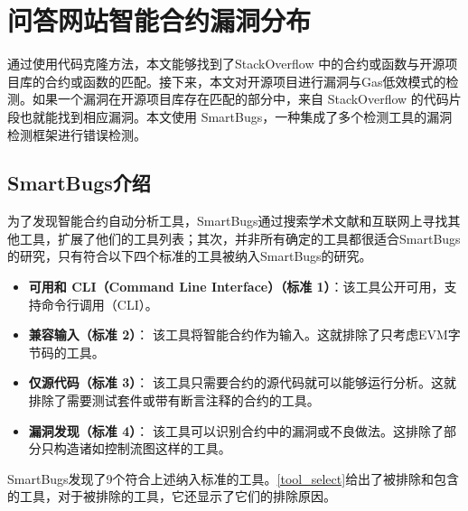 

\section{\label{bugAnalysis}问答网站智能合约漏洞分布}

通过使用代码克隆方法，本文能够找到了StackOverflow 中的合约或函数与开源项目库的合约或函数的匹配。接下来，本文对开源项目进行漏洞与Gas低效模式的检测。如果一个漏洞在开源项目库存在匹配的部分中，来自 StackOverflow 的代码片段也就能找到相应漏洞。本文使用 SmartBugs\cite{smart_contract}，一种集成了多个检测工具的漏洞检测框架进行错误检测。

\subsection{SmartBugs介绍}
为了发现智能合约自动分析工具，SmartBugs通过搜索学术文献\cite{toolSurvey}和互联网上寻找其他工具，扩展了他们的工具列表；其次，并非所有确定的工具都很适合SmartBugs的研究，只有符合以下四个标准的工具被纳入SmartBugs的研究。

\begin{itemize}

\item \textbf{可用和 CLI（Command Line Interface）（标准 1）}：该工具公开可用，支持命令行调用（CLI）。

\item \textbf{兼容输入（标准 2）}： 该工具将智能合约作为输入。这就排除了只考虑EVM字节码的工具。

\item \textbf{仅源代码（标准 3）}： 该工具只需要合约的源代码就可以能够运行分析。这就排除了需要测试套件或带有断言注释的合约的工具。

\item \textbf{漏洞发现（标准 4）}： 该工具可以识别合约中的漏洞或不良做法。这排除了部分只构造诸如控制流图这样的工具。

\end{itemize}

SmartBugs发现了9个符合上述纳入标准的工具。\ref{tool_select}给出了被排除和包含的工具，对于被排除的工具，它还显示了它们的排除原因。


